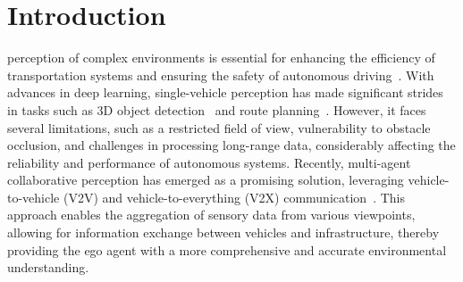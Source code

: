 \documentclass[lettersize,journal]{IEEEtran}
\begin{document}
\section{Introduction}
 perception of complex environments is essential for enhancing the efficiency of transportation systems and ensuring the safety of autonomous driving~\cite{10614862}. With advances in deep learning, single-vehicle perception has made significant strides in tasks such as 3D object detection~\cite{10637966} and route planning~\cite{9385941}. However, it faces several limitations, such as a restricted field of view, vulnerability to obstacle occlusion, and challenges in processing long-range data, considerably affecting the reliability and performance of autonomous systems. Recently, multi-agent collaborative perception has emerged as a promising solution, leveraging vehicle-to-vehicle (V2V) and vehicle-to-everything (V2X) communication~\cite{10248946,10700656}. This approach enables the aggregation of sensory data from various viewpoints, allowing for information exchange between vehicles and infrastructure, thereby providing the ego agent with a more comprehensive and accurate environmental understanding.
\end{document}
